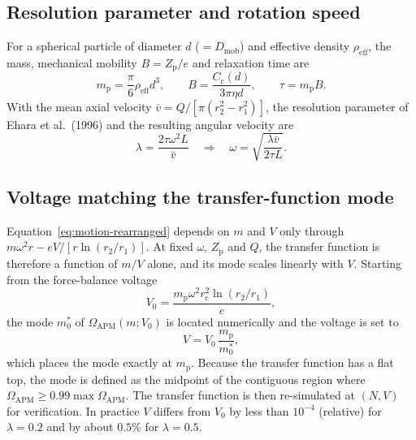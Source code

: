 \documentclass[11pt,a4paper]{article}
\begin{document}
\subsection{Resolution parameter and rotation speed}
\label{sec:lambda}

For a spherical particle of diameter $d$ ($= D_{\mathrm{mob}}$) and effective
density $\rho_{\mathrm{eff}}$, the mass, mechanical mobility
$B = Z_{\mathrm{p}}/e$ and relaxation time are
\begin{equation}
  m_{\mathrm{p}} = \frac{\pi}{6} \rho_{\mathrm{eff}} d^{3}, \qquad
  B = \frac{C_{\mathrm{c}}(d)}{3\pi\eta d}, \qquad
  \tau = m_{\mathrm{p}} B.
  \label{eq:sphere-properties}
\end{equation}
With the mean axial velocity
$\bar{v} = Q/[\pi(r_{2}^{2} - r_{1}^{2})]$, the resolution parameter of
Ehara et al.\ (1996) and the resulting angular velocity are
\begin{equation}
  \lambda = \frac{2\tau\omega^{2}L}{\bar{v}}
  \quad\Longrightarrow\quad
  \omega = \sqrt{\frac{\lambda\bar{v}}{2\tau L}}.
  \label{eq:lambda}
\end{equation}

\subsection{Voltage matching the transfer-function mode}
\label{sec:mode-matching}

Equation~\eqref{eq:motion-rearranged} depends on $m$ and $V$ only through
$m\omega^{2}r - eV/[r\ln(r_{2}/r_{1})]$. At fixed $\omega$,
$Z_{\mathrm{p}}$ and $Q$, the transfer function is therefore a function of
$m/V$ alone, and its mode scales linearly with $V$. Starting from the
force-balance voltage
\begin{equation}
  V_{0} = \frac{m_{\mathrm{p}}\omega^{2} r_{\mathrm{c}}^{2}\ln(r_{2}/r_{1})}{e},
  \label{eq:force-balance-voltage}
\end{equation}
the mode $m_{0}^{*}$ of $\Omega_{\mathrm{APM}}(m; V_{0})$ is located
numerically and the voltage is set to
\begin{equation}
  V = V_{0}\,\frac{m_{\mathrm{p}}}{m_{0}^{*}},
  \label{eq:mode-voltage}
\end{equation}
which places the mode exactly at $m_{\mathrm{p}}$. Because the transfer
function has a flat top, the mode is defined as the midpoint of the
contiguous region where
$\Omega_{\mathrm{APM}} \geq 0.99\max\Omega_{\mathrm{APM}}$. The transfer
function is then re-simulated at $(N, V)$ for verification. In practice
$V$ differs from $V_{0}$ by less than $10^{-4}$ (relative) for
$\lambda = 0.2$ and by about $0.5\%$ for $\lambda = 0.5$.
\end{document}
